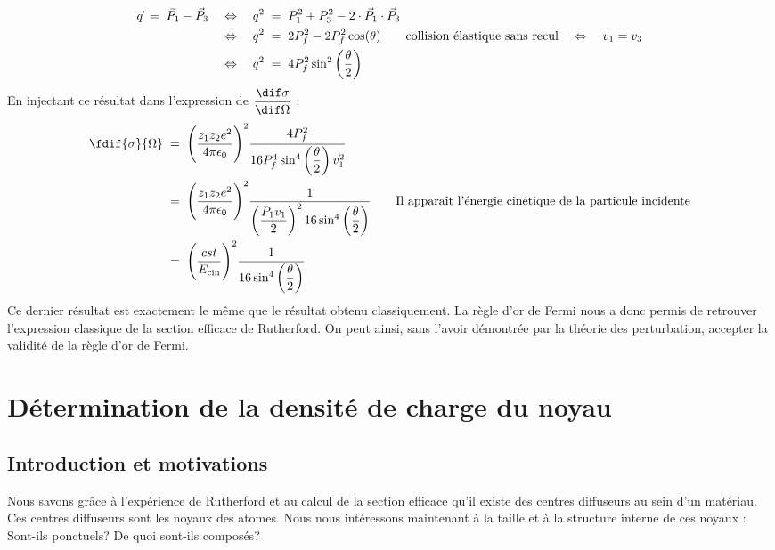 \begin{align*}
    \vec{q} \; = \; \vec{P}_1 - \vec{P}_3
        &\quad \Leftrightarrow \quad
    q^2 \; = \; P_1^2 + P_3^2 - 2 \cdot \vec{P}_1 \cdot \vec{P}_3\\
        &\quad \Leftrightarrow \quad
    q^2 \; = \; 2 P_f^2 - 2 P_f^2 \cos(\theta)
    \qquad \text{collision élastique sans recul} \quad \Leftrightarrow \quad v_1=v_3\\
        &\quad \Leftrightarrow \quad
    q^2 \; = \; 4 P_f^2 \sin^2\left(\dfrac{\theta}{2}\right)
\end{align*}
En injectant ce résultat dans l'expression de  $\dfrac{\dif\sigma}{\dif\Omega}$ :
\begin{align*}
    \fdif{\sigma}{\Omega}
        &\eq
    \Bigg( \dfrac{z_1 z_2e^2}{4\pi\epsilon_0} \Bigg)^2 
    \dfrac{4 P_f^2}{16 P_f^4 \sin^4\left(\dfrac{\theta}{2}\right)v^2_1}\\
        &\eq
    \Bigg( \dfrac{z_1 z_2e^2}{4\pi\epsilon_0} \Bigg)^2
    \dfrac{1}{ \left(\dfrac{P_1v_1}{2}\right)^2 16\sin^4\left(\dfrac{\theta}{2}\right)}
    \qquad \text{Il apparaît l'énergie cinétique de la particule incidente}\\
    &\eq
    \Bigg( \dfrac{cst}{E_\text{cin}} \Bigg)^2
    \dfrac{1}{16\sin^4\left(\dfrac{\theta}{2}\right)}
\end{align*}
Ce dernier résultat est exactement le même que le résultat obtenu classiquement. La règle d'or de Fermi nous a donc permis de retrouver l'expression classique de la section efficace de Rutherford. On peut ainsi, sans l'avoir démontrée par la théorie des perturbation, accepter la validité de la règle d'or de Fermi.






\section{Détermination de la densité de charge du noyau}
\subsection{Introduction et motivations}

Nous savons grâce à l'expérience de Rutherford et au calcul de la section efficace qu'il existe des centres diffuseurs au sein d'un matériau. Ces centres diffuseurs sont les noyaux des atomes. Nous nous intéressons maintenant à la taille et à la structure interne de ces noyaux : Sont-ils ponctuels? De quoi sont-ils composés?

